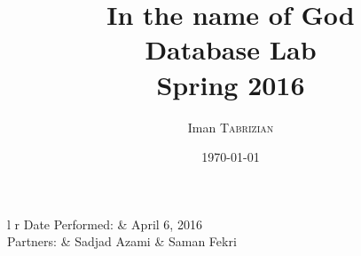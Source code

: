 \documentclass{article}
\title{In the name of God \\ Database Lab \\ Spring 2016} %
\author{Iman \textsc{Tabrizian}} %
\date{\today} %
\begin{document}
\maketitle %

\begin{center}
	\begin{tabular}{l r}
		Date Performed: & April 6, 2016 \\ %
		Partners: & Sadjad Azami & Saman Fekri\\ %
	\end{tabular}
\end{center}


\end{document}
